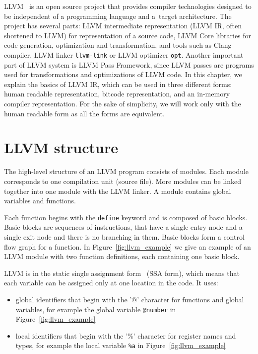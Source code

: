 LLVM~\cite{llvm} is an open source project that provides compiler technologies
designed to be independent of a programming language and a~target architecture.
The project has several parts: LLVM intermediate representation (LLVM IR, often
shortened to LLVM) for representation of a source code, LLVM Core libraries for
code generation, optimization and transformation, and tools such as Clang
compiler, LLVM linker \texttt{llvm-link} or LLVM optimizer \texttt{opt}.
Another important part of LLVM system is LLVM Pass Framework, since LLVM
passes are programs used for transformations and optimizations of LLVM code. In
this chapter, we explain the basics of LLVM IR, which can be used in three
different forms: human readable representation, bitcode representation, and an
in-memory compiler representation. For the sake of simplicity, we will work
only with the human readable form as all the forms are equivalent.


\section{LLVM structure}

The high-level structure of an LLVM program consists of modules. Each module
corresponds to one compilation unit (source file). More modules can be linked
together into one module with the LLVM linker. A module contains global
variables and functions.

Each function begins with the \texttt{define} keyword and is composed of basic
blocks. Basic blocks are sequences of instructions, that have a single entry node
and a single exit node and there is no branching in them. Basic blocks form
a control flow graph for a function. In Figure~\ref{fig:llvm_example} we give
an example of an LLVM module with two function definitions, each containing one
basic block.

LLVM is in the static single assignment form~\cite{ssa} (SSA form), which means that each
variable can be assigned only at one location in the code. It uses:

\begin{itemize}
    \item global identifiers that begin with the '@' character for functions
    and global variables, for example the global variable \texttt{@number} in
    Figure~\ref{fig:llvm_example}
    \item local identifiers that begin with the '\%' character for register
    names and types, for example the local variable \texttt{\%a} in
    Figure~\ref{fig:llvm_example}
\end{itemize}

